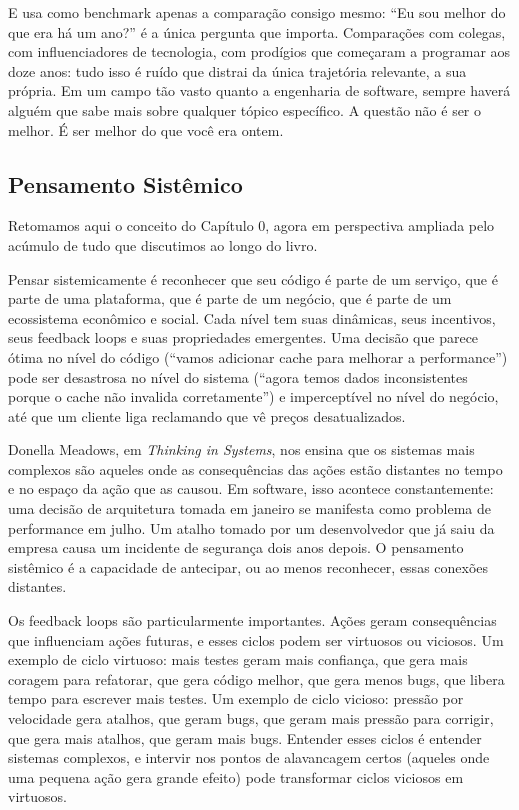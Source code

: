 E usa como benchmark apenas a comparação consigo mesmo: ``Eu sou melhor
do que era há um ano?'' é a única pergunta que importa. Comparações com
colegas, com influenciadores de tecnologia, com prodígios que começaram
a programar aos doze anos: tudo isso é ruído que distrai da única
trajetória relevante, a sua própria. Em um campo tão vasto quanto a
engenharia de software, sempre haverá alguém que sabe mais sobre
qualquer tópico específico. A questão não é ser o melhor. É ser
melhor do que você era ontem.

\subsection{Pensamento Sistêmico}

Retomamos aqui o conceito do Capítulo 0, agora em perspectiva ampliada
pelo acúmulo de tudo que discutimos ao longo do livro.

Pensar sistemicamente é reconhecer que seu código é parte de um
serviço, que é parte de uma plataforma, que é parte de um negócio, que
é parte de um ecossistema econômico e social. Cada nível tem suas
dinâmicas, seus incentivos, seus feedback loops e suas propriedades
emergentes. Uma decisão que parece ótima no nível do código (``vamos
adicionar cache para melhorar a performance'') pode ser desastrosa
no nível do sistema (``agora temos dados inconsistentes porque o
cache não invalida corretamente'') e imperceptível no nível do
negócio, até que um cliente liga reclamando que vê preços desatualizados.

Donella Meadows, em \textit{Thinking in Systems}, nos ensina que os
sistemas mais complexos são aqueles onde as consequências das ações
estão distantes no tempo e no espaço da ação que as causou. Em software,
isso acontece constantemente: uma decisão de arquitetura tomada em
janeiro se manifesta como problema de performance em julho. Um atalho
tomado por um desenvolvedor que já saiu da empresa causa um incidente
de segurança dois anos depois. O pensamento sistêmico é a capacidade
de antecipar, ou ao menos reconhecer, essas conexões distantes.

Os feedback loops são particularmente importantes. Ações geram
consequências que influenciam ações futuras, e esses ciclos podem ser
virtuosos ou viciosos. Um exemplo de ciclo virtuoso: mais testes geram
mais confiança, que gera mais coragem para refatorar, que gera código
melhor, que gera menos bugs, que libera tempo para escrever mais
testes. Um exemplo de ciclo vicioso: pressão por velocidade gera
atalhos, que geram bugs, que geram mais pressão para corrigir, que gera
mais atalhos, que geram mais bugs. Entender esses ciclos é entender
sistemas complexos, e intervir nos pontos de alavancagem certos
(aqueles onde uma pequena ação gera grande efeito) pode transformar
ciclos viciosos em virtuosos.

